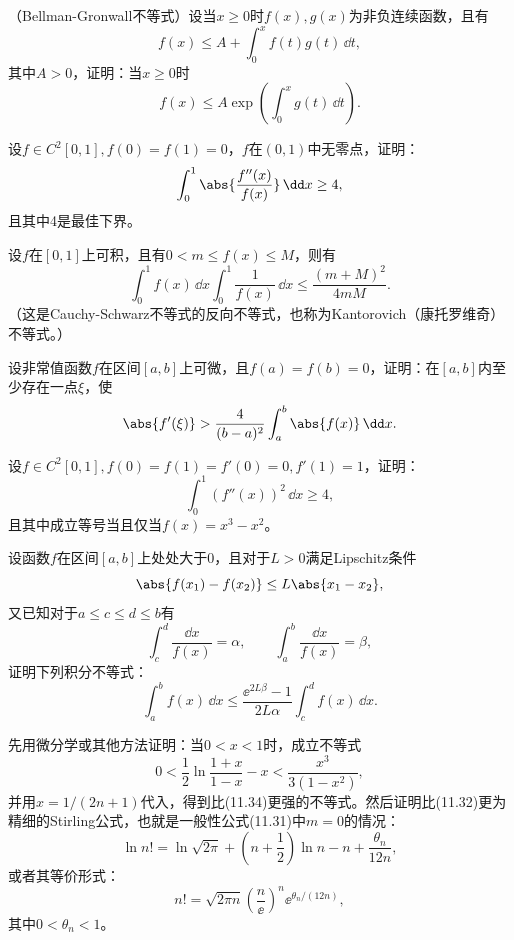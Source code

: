 \begin{xreferenceproblem}[9]
（Bellman-Gronwall不等式）设当$x\ge0$时$f(x),g(x)$为非负连续函数，且有
  \[
    f(x)\le A+\int_0^xf(t)g(t)\,\dd t,
  \]
  其中$A>0$，证明：当$x\ge0$时
  \[
    f(x)\le A\exp\left(\int_0^xg(t)\,\dd t\right).
  \]
\end{xreferenceproblem}

\begin{xreferenceproblem}[10]
设$f\in C^2[0,1],f(0)=f(1)=0$，$f$在$(0,1)$中无零点，证明：
  \[
    \int_0^1\abs{\frac{f''(x)}{f(x)}}\,\dd x\ge4,
  \]
  且其中4是最佳下界。
\end{xreferenceproblem}

\begin{xreferenceproblem}[11]
设$f$在$[0,1]$上可积，且有$0<m\le f(x)\le M$，则有
  \[
    \int_0^1f(x)\,\dd x\int_0^1\frac1{f(x)}\,\dd x
    \le\frac{(m+M)^2}{4mM}.
  \]
  （这是Cauchy-Schwarz不等式的反向不等式，也称为Kantorovich（康托罗维奇）不等式。）
\end{xreferenceproblem}

\begin{xreferenceproblem}[12]
设非常值函数$f$在区间$[a,b]$上可微，且$f(a)=f(b)=0$，证明：在$[a,b]$内至少存在一点$\xi$，使
  \[
    \abs{f'(\xi)}>\frac4{(b-a)^2}\int_a^b\abs{f(x)}\,\dd x.
  \]
\end{xreferenceproblem}

\begin{xreferenceproblem}[13]
设$f\in C^2[0,1],f(0)=f(1)=f'(0)=0,f'(1)=1$，证明：
  \[
    \int_0^1(f''(x))^2\,\dd x\ge4,
  \]
  且其中成立等号当且仅当$f(x)=x^3-x^2$。
\end{xreferenceproblem}

\begin{xreferenceproblem}[14]
设函数$f$在区间$[a,b]$上处处大于0，且对于$L>0$满足Lipschitz条件
  \[
    \abs{f(x_1)-f(x_2)}\le L\abs{x_1-x_2},
  \]
  又已知对于$a\le c\le d\le b$有
  \[
    \int_c^d\frac{\dd x}{f(x)}=\alpha,
    \qquad
    \int_a^b\frac{\dd x}{f(x)}=\beta,
  \]
  证明下列积分不等式：
  \[
    \int_a^bf(x)\,\dd x
    \le\frac{\ee^{2L\beta}-1}{2L\alpha}\int_c^df(x)\,\dd x.
  \]
\end{xreferenceproblem}

\begin{xreferenceproblem}[15]
先用微分学或其他方法证明：当$0<x<1$时，成立不等式
  \[
    0<\frac12\ln\frac{1+x}{1-x}-x<\frac{x^3}{3(1-x^2)},
  \]
  并用$x=1/(2n+1)$代入，得到比(11.34)更强的不等式。然后证明比(11.32)更为精细的Stirling公式，也就是一般性公式(11.31)中$m=0$的情况：
  \[
    \ln n!=\ln\sqrt{2\pi}+\left(n+\frac12\right)\ln n-n+\frac{\theta_n}{12n},
  \]
  或者其等价形式：
  \[
    n!=\sqrt{2\pi n}\left(\frac n\ee\right)^n\ee^{\theta_n/(12n)},
  \]
  其中$0<\theta_n<1$。
\end{xreferenceproblem}

